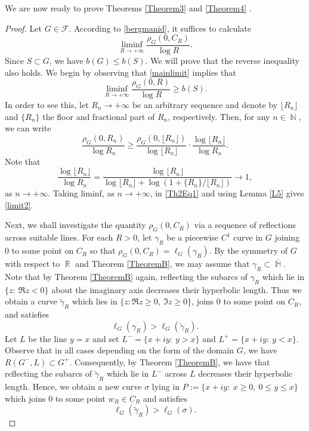 \documentclass[11pt, letterpaper,leqno]{amsart}
\numberwithin{equation}{section}
\theoremstyle{definition}
\DeclareMathOperator{\N}{\mathbb{N}}
\DeclareMathOperator{\R}{\mathbb{R}}
\DeclareMathOperator{\Ha}{\mathbb{H}}
\newcommand{\floor}[1]{\lfloor #1 \rfloor}
\begin{document}
\medskip

We are now ready to prove Theorems \ref{Theorem3} and \ref{Theorem4} .
\begin{proof}
Let $G\in\mathcal{F}$. According to \eqref{bergmanid}, it suffices to calculate
\[
\liminf_{R\to +\infty} \frac{\rho_G(0,C_R)}{\log R}.
\]
Since $S\subset G$, we have $b(G)\leq b(S)$. We will prove that the reverse inequality also holds. We begin by observing that \eqref{mainlimit} implies that 
\begin{equation}\label{limit2}
	\liminf_{R\to +\infty}\frac{\rho_G(0,R)}{\log R} \geq b(S).
\end{equation}
In order to see this, let $R_n\to +\infty$ be an arbitrary sequence and denote by $\floor{R_n}$ and $\{R_n\}$ the floor and fractional part of $R_n$, respectively. Then, for any $n\in\N$, we can write
\begin{equation}\label{Th2Eq1}
\frac{\rho_G(0,R_n)}{\log R_n}\geq\frac{\rho_G(0,\floor{R_n})}{\log \floor{R_n}}\cdot\frac{\log\floor{R_n}}{\log R_n}.
\end{equation}
Note that 
\[
\frac{\log\floor{R_n}}{\log R_n}=\frac{\log\floor{R_n}}{\log \floor{R_n}+\log\left(1+\{R_n\}/\floor{R_n}\right)}\to 1,
\]
as $n\to +\infty$. Taking liminf, as $n\to +\infty$, in \eqref{Th2Eq1} and using Lemma \ref{L5} gives \eqref{limit2}.

Next, we shall investigate the quantity $\rho_G(0,C_R)$ via a sequence of reflections across suitable lines. For each $R>0$, let $\gamma_R$ be a piecewise $C^1$ curve in $G$ joining $0$ to some point on $C_R$ so that $\rho_G(0,C_R)=\ell_G(\gamma_R)$. By the symmetry of $G$ with respect to $\R$ and Theorem \ref{TheoremB}, we may assume that $\gamma_R\subset\overline{\Ha}$. Note that by Theorem \ref{TheoremB} again, reflecting the subarcs of $\gamma_R$ which lie in $\{z:\ \Re z<0\}$ about the imaginary axis decreases their hyperbolic length. Thus we obtain a curve $\tilde{\gamma}_R$ which lies in $\{z: \Re z\geq 0,\ \Im z\geq 0\}$, joins $0$ to some point on $C_R$, and satisfies
\begin{equation}\label{Th2Eq2}
	\ell_G(\gamma_R)>\ell_G(\tilde{\gamma}_R).
\end{equation}
Let $L$ be the line $y=x$ and set $L^{-}=\{x+iy:\ y>x\}$ and $L^{+}=\{x+iy:\ y<x\}$. Observe that in all cases depending on the form of the domain $G$, we have $R(G^{-},L)\subset G^{+}$. Consequently, by Theorem \ref{TheoremB}, we have that reflecting the subarcs of $\tilde{\gamma}_R$ which lie in $L^{-}$ across $L$ decreases their hyperbolic length. Hence, we obtain a new curve $\sigma$ lying in $P:=\{x+iy:\ x\geq 0,\ 0\leq y\leq x\}$ which joins $0$ to some point $w_R\in C_R$ and satisfies
\begin{equation}\label{Th2Eq3}
	\ell_G(\tilde{\gamma}_R)>\ell_G(\sigma).
\end{equation}


\end{proof}
\end{document}
